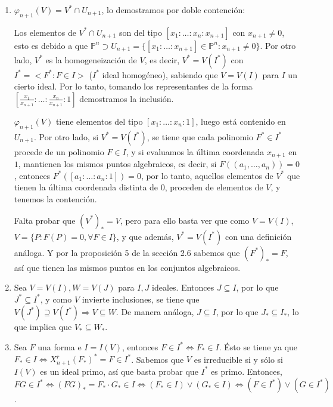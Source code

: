 \begin{Dem}
  \begin{enumerate}
  \item $\varphi_{n+1}(V)=V^*\cap U_{n+1}$, lo demostramos por doble contención:

    \framebox{$\supseteq $} Los elementos de $V^*\cap U_{n+1}$ son del tipo $[x_1:\dots:x_n:x_{n+1}]$ con $x_{n+1}\neq 0$, esto es debido a que $\mathbb{P}^n \supset U_{n+1}= \{[x_1:\dots : x_{n+1}]\in \mathbb{P}^n : x_{n+1}\neq 0 \}$. Por otro lado, $V^*$ es la homogeneización de $V$, es decir, $V^*=V(I^*)$ con $I^*=<F^*:F\in I>$ ($I^*$ ideal homogéneo), sabiendo que $V=V(I)$ para $I$ un cierto ideal. Por lo tanto, tomando los representantes de la forma $[\frac{x_1}{x_{n+1}}:\dots :\frac{x_n}{x_{n+1}}: 1]$ demostramos la inclusión.
    
    \framebox{$\subseteq$} $\varphi_{n+1}(V)$ tiene elementos del tipo $[x_1:\dots :x_n:1]$, luego está contenido en $U_{n+1}$. Por otro lado, si $V^*=V(I^*)$, se tiene que cada polinomio $F^* \in I^*$ procede de un polinomio $F\in I$, y si evaluamos la última coordenada $x_{n+1}$ en $1$, mantienen los mismos puntos algebraicos, es decir, si $F((a_1,\dots, a_n))=0$, entonces $F^*([a_1:\dots :a_n:1])=0$, por lo tanto, aquellos elementos de $V^*$ que tienen la última coordenada distinta de $0$, proceden de elementos de $V$, y tenemos la contención.

    Falta probar que $(V^*)_*=V$, pero para ello basta ver que como $V=V(I)$, $V=\{P: F(P)=0, \forall F \in I\}$, y que además, $V^*=V(I^*)$ con una definición análoga. Y por la proposición 5 de la sección 2.6 sabemos que $(F^*)_*=F$, así que tienen las mismos puntos en los conjuntos algebraicos.


  \item Sea $V=V(I), W=V(J)$ para $I,J$ ideales. Entonces $J\subseteq I$, por lo que $J^*\subseteq I^*$, y como $V$ invierte inclusiones, se tiene que $V(J^*)\supseteq V(I^*) \Rightarrow V\subseteq W$. De manera análoga, $J\subseteq I$, por lo que $J_*\subseteq I_*$, lo que implica que $V_*\subseteq W_*$.

  \item Sea $F$ una forma e $I=I(V)$, entonces $F\in I^* \Leftrightarrow F_*\in I$. Ésto se tiene ya que $F_*\in I \Leftrightarrow X_{n+1}^r(F_*)^*=F \in I^*$. Sabemos que $V$ es irreducible si y sólo si $I(V)$ es un ideal primo, así que basta probar que $I^*$ es primo. Entonces, $FG\in I^*\Leftrightarrow (FG)_*=F_*\cdot G_*\in I \Leftrightarrow (F_*\in I)\vee (G_*\in I) \Leftrightarrow (F\in I^*) \vee (G \in I^*)$.


\end{enumerate}
\end{Dem}
